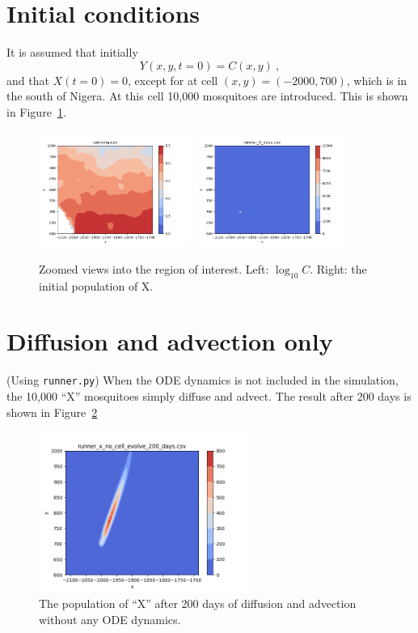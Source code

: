 \documentclass{article}
\begin{document}
\section{Initial conditions}

It is assumed that initially
\begin{equation}
  Y(x, y, t=0) = C(x, y) \ ,
\end{equation}
and that $X(t=0)=0$, except for at cell $(x, y) = (-2000, 700)$, which is in the south of Nigera.  At this cell 10,000 mosquitoes are introduced.  This is shown in Figure~\ref{zoom_0.fig}.

\begin{figure}[htb]
  \centering
  \includegraphics[width=5cm]{carrying_zoom.png} \quad
  \includegraphics[width=5cm]{runner_0_days.png}
  \caption{\label{zoom_0.fig}Zoomed views into the region of interest.  Left: $\log_{10}C$.  Right: the initial population of X.}
\end{figure}

\section{Diffusion and advection only}

(Using {\tt runner.py})  When the ODE dynamics is not included in the simulation, the 10,000 ``X'' mosquitoes simply diffuse and advect.  The result after 200 days is shown in Figure~\ref{runner_x_no_cell_evolve_200_days.fig}

\begin{figure}[htb]
  \centering
  \includegraphics[width=7cm]{runner_x_no_cell_evolve_200_days.png}
  \caption{\label{runner_x_no_cell_evolve_200_days.fig}The population of ``X'' after 200 days of diffusion and advection without any ODE dynamics.}
\end{figure}
\end{document}
